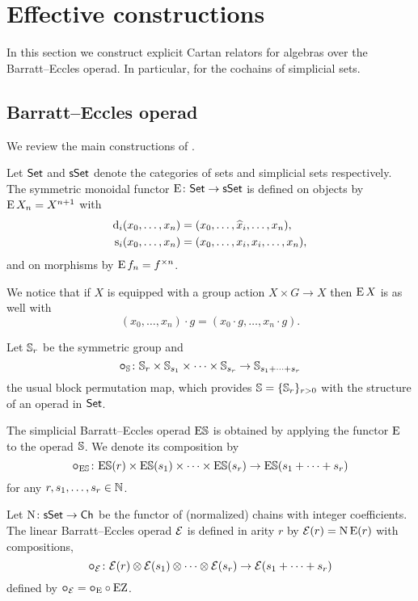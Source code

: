 
\section{Effective constructions}

In this section we construct explicit Cartan relators for algebras over the Barratt--Eccles operad.
In particular, for the cochains of simplicial sets.

\subsection{Barratt--Eccles operad}

We review the main constructions of \cite{berger2004combinatorial}.

\sssec

Let $\mathsf{Set}$ and $\mathsf{sSet}$ denote the categories of sets and simplicial sets respectively.
The symmetric monoidal functor $\operatorname{E} \colon \mathsf{Set} \to \mathsf{sSet}$ is defined on objects by $\operatorname{E} X_n = X^{n+1}$ with
\[
\begin{split}
	\operatorname{d}_i(x_0,\dots,x_n) &= (x_0,\dots,\widehat{x}_i,\dots,x_n), \\
	\operatorname{s}_i(x_0,\dots,x_n) &= (x_0, \dots, x_i, x_i, \dots, x_n),
\end{split}
\]
and on morphisms by $\operatorname{E} f_n = f^{\times n}$.

We notice that if $X$ is equipped with a group action $X \times G \to X$ then $\operatorname{E} X$ is as well with
\[
(x_0,\dots,x_n) \cdot g = (x_0 \cdot g, \dots, x_n \cdot g).
\]

\sssec

Let $\mathbb{S}_r$ be the symmetric group and
\[
\bm{\circ}_{\mathbb{S}} \colon \mathbb{S}_r \times \mathbb{S}_{s_1} \times \cdots \times \mathbb{S}_{s_r} \to \mathbb{S}_{s_1+\dots+s_r}
\]
the usual block permutation map, which provides $\mathbb{S} = \{\mathbb{S}_r\}_{r>0}$ with the structure of an operad in $\mathsf{Set}$.

\sssec

The simplicial Barratt--Eccles operad $\mathrm{E}\mathbb{S}$ is obtained by applying the functor $\operatorname{E}$ to the operad $\mathbb{S}$.
We denote its composition by
\[
\bm{\circ}_{\mathrm{E}\mathbb{S}} \colon \mathrm{E}\mathbb{S}(r) \times \mathrm{E}\mathbb{S}(s_1) \times\dots\times \mathrm{E}\mathbb{S}(s_r) \to \mathrm{E}\mathbb{S}(s_1+\dots+s_r)
\]
for any $r,s_1,\dots,s_r \in \mathbb{N}$.

\sssec

Let $\operatorname{N} \colon \mathsf{sSet} \to \mathsf{Ch}$ be the functor of (normalized) chains with integer coefficients.
The linear Barratt--Eccles operad $\mathcal{E}$ is defined in arity $r$ by $\mathcal{E}(r) = \operatorname{N}\operatorname{E}(r)$ with compositions,
\[
\bm{\circ}_{\mathcal{E}} \colon \mathcal{E}(r) \otimes \mathcal{E}(s_1) \otimes\dotsb\otimes \mathcal{E}(s_r) \to \mathcal{E}(s_1+\dots+s_r)
\]
defined by $\bm{\circ}_{\mathcal{E}} = \bm{\circ}_{\operatorname{E}} \circ \operatorname{EZ}$.

